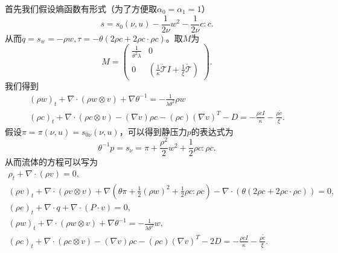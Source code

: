 	首先我们假设熵函数有形式（为了方便取$\alpha_0=\alpha_1=1$）
	\begin{equation*}
			s = s_0(\nu,u)  - \frac{1}{2 \nu } w^2 - \frac{1}{2  \nu } c:c.
	\end{equation*}
	从而$q=s_w=-{\rho w},\tau = - \theta (2 \rho c + 2 \rho c \cdot \rho c)$。取$M$为
	\begin{equation*}
		M = \left( \begin{array}{ccc} 
			\frac{1}{\theta^2 \lambda} & 0 \\
			0 &  (\frac{1}{\kappa}\dot{\mathcal{T}} I +  \frac{1}{\xi}\mathring{\mathcal{T}}  )
		\end{array} \right).
	\end{equation*}
	我们得到
\begin{eqnarray*}
			(\rho w)_t +  \nabla \cdot (\rho w \otimes v)  + \nabla \theta^{-1} = -\frac{1}{\lambda \theta^2}  \rho w \\
			(\rho c)_t +  \nabla \cdot (\rho c \otimes v) - (\nabla v) \rho c - (\rho c) (\nabla v)^T - D = - \frac{\rho \dot{c}I}{\kappa} -  \frac{\rho \mathring{c}}{\xi} .
\end{eqnarray*}
假设$\pi=\pi(\nu,u) = s_{0\nu}(\nu,u)$，可以得到静压力$p$的表达式为
\begin{equation*}
			\theta^{-1} p = s_\nu = \pi +\frac{\rho^2}{2} w^2 + \frac{1}{2} \rho c: \rho c.
\end{equation*}
从而流体的方程可以写为
\begin{subequations} \label{eq:ECDFsecond}
		\begin{align*}
			\rho_t + \nabla \cdot (\rho v) = 0 ,\\
			(\rho v)_t + \nabla \cdot (\rho v \otimes v) + \nabla (\theta\pi +\frac{1}{2} (\rho w)^2 + \frac{1}{2} \rho c: \rho c)  - \nabla \cdot (\theta (2 \rho c + 2 \rho c \cdot \rho c)) =0 ,\\
			(\rho e)_t + \nabla \cdot q + \nabla \cdot (P \cdot v) = 0, \\
			(\rho w)_t + \nabla \cdot (\rho w \otimes v) + \nabla \theta^{-1} = -\frac{1}{\lambda \theta^2} w, \\
			(\rho c)_t +  \nabla \cdot (\rho c \otimes v) - (\nabla v) \rho c - (\rho c) (\nabla v)^T - 2 D = - \frac{\rho \dot{c}I}{\kappa} -  \frac{\rho \mathring{c}}{\xi}  .
		\end{align*}
	\end{subequations}

